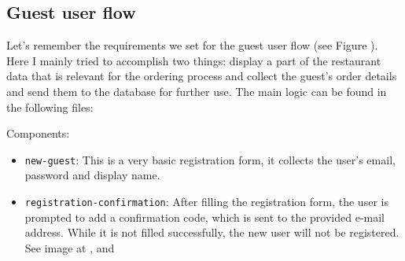 \subsection{Guest user flow}

Let's remember the requirements we set for the guest user flow (see Figure ). Here I mainly tried to accomplish two things: display a part of the restaurant data that is relevant for the ordering process and collect the guest's order details and send them to the database for further use. The main logic can be found in the following files:

Components:
\begin{itemize}	
	\item \verb+new-guest+: This is a very basic registration form, it collects the user's email, password and display name.
	
	
	\item \verb+registration-confirmation+: After filling the registration form, the user is prompted to add a confirmation code, which is sent to the provided e-mail address. While it is not filled successfully, the new user will not be registered. See image at ,  and 
	

\end{itemize}
